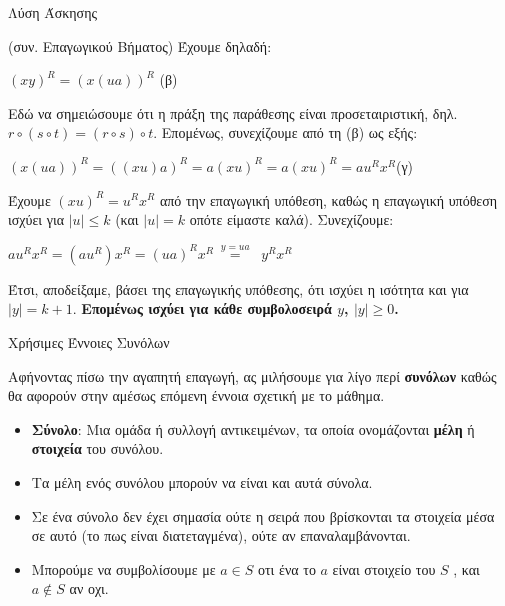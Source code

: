 \documentclass[size=14pt, paper=smartboard, style=fyma, mode=present]{powerdot}
\begin{document}
\begin{slide}[trans=Glitter, toc=]{Λύση Άσκησης}
{\normalsize
	(συν. Επαγωγικού Βήματος) Έχουμε δηλαδή:
\begin{center}
	$(xy)^R = (x(ua))^R$ (β)
\end{center}
\pause
Εδώ να σημειώσουμε ότι η πράξη της παράθεσης είναι προσεταιριστική, δηλ. $r \circ (s \circ t) = (r \circ s) \circ t$. Επομένως, συνεχίζουμε από τη (β) ως εξής:
\begin{center}
	$(x(ua))^R = ((xu)a)^R = a(xu)^R =a(xu)^R=a$\boldmath$u^Rx^R$\unboldmath (γ)
\end{center}
\pause
Έχουμε $(xu)^R = u^Rx^R$ από την επαγωγική υπόθεση, καθώς η επαγωγική υπόθεση ισχύει για $|u| \le k$ (και $|u| = k$ οπότε είμαστε καλά). Συνεχίζουμε:
\begin{center}
	$au^Rx^R=(au^R)x^R=(ua)^Rx^R ~ \stackrel{y=ua}{=} ~ $ \boldmath $y^Rx^R$ \unboldmath 
\end{center}
}
Έτσι, αποδείξαμε, βάσει της επαγωγικής υπόθεσης, ότι ισχύει η ισότητα και για $|y|=k+1$. \textbf{Επομένως ισχύει για κάθε συμβολοσειρά $y$, $|y|\ge0$.}
\end{slide}
\begin{slide}[toc={Βάσικες Έννοιες Συνόλων}]{Χρήσιμες Έννοιες Συνόλων}
{\large
	Αφήνοντας πίσω την αγαπητή επαγωγή, ας μιλήσουμε για λίγο περί \textbf{συνόλων} καθώς θα αφορούν στην αμέσως επόμενη έννοια σχετική με το μάθημα.
	\begin{itemize}
		\item \textbf{Σύνολο}: Μια ομάδα ή συλλογή αντικειμένων, τα οποία ονομάζονται \textbf{μέλη} ή \textbf{στοιχεία} του συνόλου. 
		\item Τα μέλη ενός συνόλου μπορούν να είναι και αυτά σύνολα.
		\item Σε ένα σύνολο δεν έχει σημασία ούτε η σειρά που βρίσκονται τα στοιχεία μέσα σε αυτό (το πως είναι διατεταγμένα), ούτε αν επαναλαμβάνονται.
		\item Μπορούμε να συμβολίσουμε με $a \in S$ οτι ένα το $a$ είναι στοιχείο του $S$ , και $a \notin S$ αν οχι.
	\end{itemize}
}
\end{slide}
\end{document}
